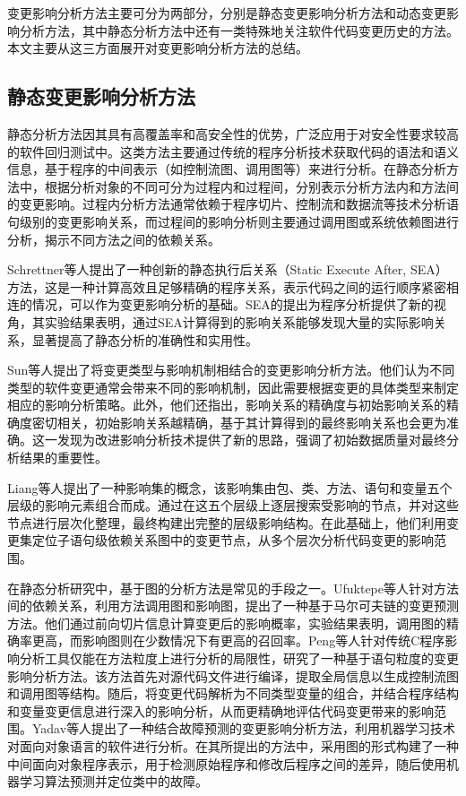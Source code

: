 变更影响分析方法主要可分为两部分，分别是静态变更影响分析方法和动态变更影响分析方法，其中静态分析方法中还有一类特殊地关注软件代码变更历史的方法。本文主要从这三方面展开对变更影响分析方法的总结。


\subsection{静态变更影响分析方法}

静态分析方法因其具有高覆盖率和高安全性的优势，广泛应用于对安全性要求较高的软件回归测试中。这类方法主要通过传统的程序分析技术获取代码的语法和语义信息，基于程序的中间表示（如控制流图、调用图等）来进行分析。在静态分析方法中，根据分析对象的不同可分为过程内和过程间，分别表示分析方法内和方法间的变更影响。过程内分析方法通常依赖于程序切片、控制流和数据流等技术\cite{2004Efficient,1991Using}分析语句级别的变更影响关系，而过程间的影响分析则主要通过调用图或系统依赖图进行分析，揭示不同方法之间的依赖关系\cite{JitenderKumarChhabra2018Improved, 2011An, 2013Analyzing}。

Schrettner等人\cite{Department2013Impact}提出了一种创新的静态执行后关系（Static Execute After, SEA）方法，这是一种计算高效且足够精确的程序关系，表示代码之间的运行顺序紧密相连的情况，可以作为变更影响分析的基础。SEA的提出为程序分析提供了新的视角，其实验结果表明，通过SEA计算得到的影响关系能够发现大量的实际影响关系，显著提高了静态分析的准确性和实用性。

Sun等人\cite{5676283}提出了将变更类型与影响机制相结合的变更影响分析方法。他们认为不同类型的软件变更通常会带来不同的影响机制，因此需要根据变更的具体类型来制定相应的影响分析策略。此外，他们还指出，影响关系的精确度与初始影响关系的精确度密切相关，初始影响关系越精确，基于其计算得到的最终影响关系也会更为准确。这一发现为改进影响分析技术提供了新的思路，强调了初始数据质量对最终分析结果的重要性。

Liang等人\cite{10430003}提出了一种影响集的概念，该影响集由包、类、方法、语句和变量五个层级的影响元素组合而成。通过在这五个层级上逐层搜索受影响的节点，并对这些节点进行层次化整理，最终构建出完整的层级影响结构。在此基础上，他们利用变更集定位子语句级依赖关系图中的变更节点，从多个层次分析代码变更的影响范围。

在静态分析研究中，基于图的分析方法是常见的手段之一。Ufuktepe等人\cite{2021Code}针对方法间的依赖关系，利用方法调用图和影响图，提出了一种基于马尔可夫链的变更预测方法。他们通过前向切片信息计算变更后的影响概率，实验结果表明，调用图的精确率更高，而影响图则在少数情况下有更高的召回率。Peng等人\cite{2022An}针对传统C程序影响分析工具仅能在方法粒度上进行分析的局限性，研究了一种基于语句粒度的变更影响分析方法。该方法首先对源代码文件进行编译，提取全局信息以生成控制流图和调用图等结构。随后，将变更代码解析为不同类型变量的组合，并结合程序结构和变量变更信息进行深入的影响分析，从而更精确地评估代码变更带来的影响范围。Yadav\cite{2022CIAFP}等人提出了一种结合故障预测的变更影响分析方法，利用机器学习技术对面向对象语言的软件进行分析。在其所提出的方法中，采用图的形式构建了一种中间面向对象程序表示，用于检测原始程序和修改后程序之间的差异，随后使用机器学习算法预测并定位类中的故障。

